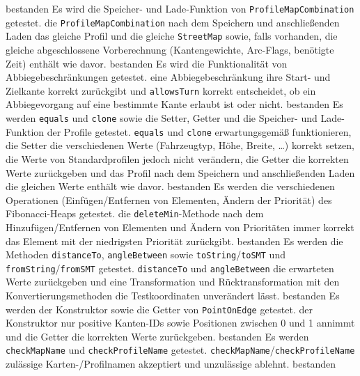 \documentclass[a4paper, 11pt]{article}
\newcommand{\code}[1]{\texttt{#1}}
\begin{document}
\begin{itemize}
     {bestanden}
     {Es wird die Speicher- und Lade-Funktion von \code{ProfileMapCombination} getestet.}
     {die \code{ProfileMapCombination} nach dem Speichern und anschließenden Laden das gleiche Profil und die gleiche \code{StreetMap} sowie, falls vorhanden, die gleiche abgeschlossene Vorberechnung (Kantengewichte, Arc-Flags, benötigte Zeit) enthält wie davor.}
     {bestanden}
     {Es wird die Funktionalität von Abbiegebeschränkungen getestet.}
     {eine Abbiegebeschränkung ihre Start- und Zielkante korrekt zurückgibt und \code{allowsTurn} korrekt entscheidet, ob ein Abbiegevorgang auf eine bestimmte Kante erlaubt ist oder nicht.}
     {bestanden}
     {Es werden \code{equals} und \code{clone} sowie die Setter, Getter und die Speicher- und Lade-Funktion der Profile getestet.}
     {\code{equals} und \code{clone} erwartungsgemäß funktionieren, die Setter die verschiedenen Werte (Fahrzeugtyp, Höhe, Breite, \dots) korrekt setzen, die Werte von Standardprofilen jedoch nicht verändern, die Getter die korrekten Werte zurückgeben und das Profil nach dem Speichern und anschließenden Laden die gleichen Werte enthält wie davor.}
     {bestanden}
     {Es werden die verschiedenen Operationen (Einfügen/Entfernen von Elementen, Ändern der Priorität) des Fibonacci-Heaps getestet.}
     {die \code{deleteMin}-Methode nach dem Hinzufügen/Entfernen von Elementen und Ändern von Prioritäten immer korrekt das Element mit der niedrigsten Priorität zurückgibt.}
     {bestanden}
     {Es werden die Methoden \code{distanceTo}, \code{angleBetween} sowie \code{toString}/\code{toSMT} und \code{fromString}/\code{fromSMT} getestet.}
     {\code{distanceTo} und \code{angleBetween} die erwarteten Werte zurückgeben und eine Transformation und Rücktransformation mit den Konvertierungsmethoden die Testkoordinaten unverändert lässt.}
     {bestanden}
     {Es werden der Konstruktor sowie die Getter von \code{PointOnEdge} getestet.}
     {der Konstruktor nur positive Kanten-IDs sowie Positionen zwischen 0 und 1 annimmt und die Getter die korrekten Werte zurückgeben.}
     {bestanden}
     {Es werden \code{checkMapName} und \code{checkProfileName} getestet.}
     {\code{checkMapName}/\code{checkProfileName} zulässige \mbox{Karten-/}\hspace{0pt}Profilnamen akzeptiert und unzulässige ablehnt.}
     {bestanden}
\end{itemize}
\end{document}
